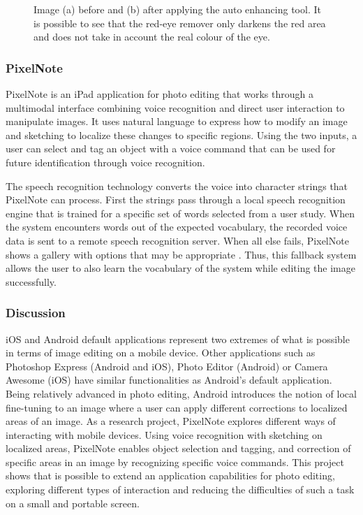 \begin{figure}[htbp]
        \centering
  \caption{Image (a) before and (b) after applying the auto enhancing tool. It is possible to see that the red-eye remover only darkens the red area and does not take in account the real colour of the eye.}
  \label{fig:ios_edit_image}
\end{figure}

\subsubsection{PixelNote}

PixelNote \cite{linder2013pixeltone} is an iPad application for photo editing that works through a multimodal interface combining voice recognition and direct user interaction to manipulate images. It uses natural language to express how to modify an image and sketching to localize these changes to specific regions. Using the two inputs, a user can select and tag an object with a voice command that can be used for future identification through voice recognition.

The speech recognition technology converts the voice into character strings that PixelNote can process. First the strings pass through a local speech recognition engine that is trained for a specific set of words selected from a user study. When the system encounters words out of the expected vocabulary, the recorded voice data is sent to a remote speech recognition server. When all else fails, PixelNote shows a gallery with options that may be appropriate . Thus, this fallback system allows the user to also learn the vocabulary of the system while editing the image successfully.

\subsubsection{Discussion}

iOS and Android default applications represent two extremes of what is possible in terms of image editing on a mobile device. Other applications such as Photoshop Express (Android and iOS), Photo Editor (Android) or Camera Awesome (iOS) have similar functionalities as Android's default application. Being relatively advanced in photo editing, Android introduces the notion of local fine-tuning to an image where a user can apply different corrections to localized areas of an image.
As a research project, PixelNote explores different ways of interacting with mobile devices. Using voice recognition with sketching on localized areas, PixelNote enables object selection and tagging, and correction of specific areas in an image by recognizing specific voice commands. This project shows that is possible to extend an application capabilities for photo editing, exploring different types of interaction and reducing the difficulties of such a task on a small and portable screen.

